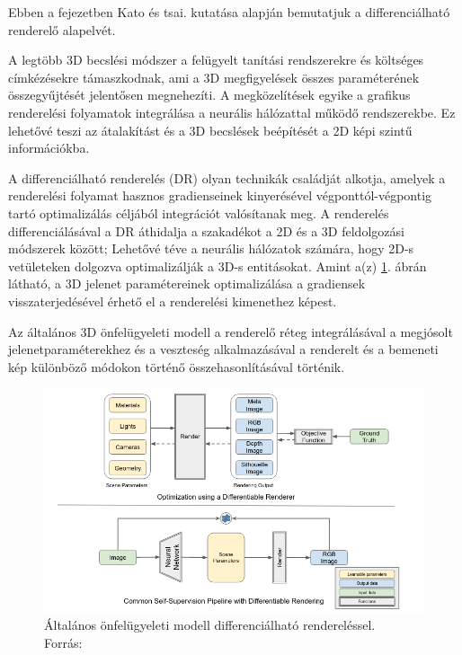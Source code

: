 \documentclass[12pt,a4]{article}
\begin{document}
                 Ebben a fejezetben Kato és tsai. \cite{diffrenderer} kutatása alapján bemutatjuk a differenciálható renderelő alapelvét.

                A legtöbb 3D becslési módszer a felügyelt tanítási rendszerekre és költséges címkézésekre támaszkodnak, ami
                a 3D megfigyelések összes paraméterének összegyűjtését jelentősen megnehezíti. A megközelítések egyike a grafikus renderelési folyamatok integrálása a neurális hálózattal működő rendszerekbe. Ez lehetővé teszi az átalakítást és a 3D becslések beépítését a 2D képi szintű információkba.

                A differenciálható renderelés (DR) olyan technikák családját alkotja, amelyek a renderelési folyamat hasznos gradienseinek kinyerésével végponttól-végpontig tartó optimalizálás céljából integrációt valósítanak meg. A renderelés differenciálásával a DR áthidalja a szakadékot
                a 2D és a 3D feldolgozási módszerek között; Lehetővé téve a neurális hálózatok számára, hogy 2D-s vetületeken dolgozva optimalizálják a 3D-s entitásokat. Amint a(z) \ref{fig:diffrenderer}. ábrán látható, a 3D jelenet paramétereinek optimalizálása a gradiensek visszaterjedésével érhető el a renderelési kimenethez képest. 

                Az általános 3D önfelügyeleti modell a renderelő réteg integrálásával a megjósolt jelenetparaméterekhez és a veszteség alkalmazásával a renderelt és a bemeneti kép különböző módokon történő összehasonlításával történik.

                \begin{figure}[h!]	
            		\centering
            		\includegraphics[width=1\linewidth]{diffrenderer}
            		\caption{Általános önfelügyeleti modell differenciálható rendereléssel.\\
                            Forrás: \cite{diffrenderer}}
                    \label{fig:diffrenderer}
            	\end{figure}
\end{document}
